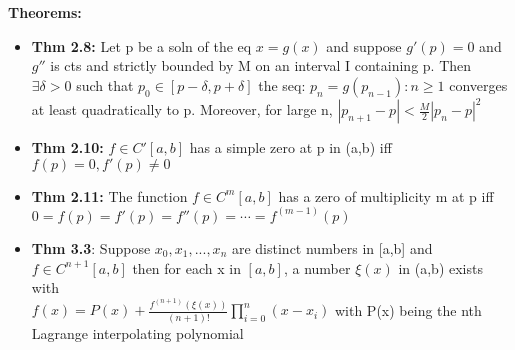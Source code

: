\documentclass{article}
\begin{document}
\begin{minipage}[t]{0.49\textwidth}
\textbf{Theorems:}
\begin{itemize}
  \item {\textbf{Thm 2.8:} Let p be a soln of the eq $x=g(x)$ and suppose $g'(p)=0$ and $g''$ is cts and strictly bounded by M on an interval I containing p. Then $\exists \delta > 0$ such that $p_0\in[p-\delta, p+\delta]$ the seq: $p_n=g(p_{n-1}): n\ge1$ converges at least quadratically to p. Moreover, for large n, $|p_{n+1}-p|<\frac{M}{2}|p_n-p|^2$ }
  \item {\textbf{Thm 2.10:} $f\in C'[a,b]$ has a simple zero at p in (a,b) iff $f(p)=0,f'(p)\ne0$ }
  \item {\textbf{Thm 2.11:} The function $f\in C^m[a,b]$ has a zero of multiplicity m at p iff $0=f(p)=f'(p)=f''(p)=\cdots=f^{(m-1)}(p)$ }
  \item {\textbf{Thm 3.3}: Suppose $x_0,x_1,...,x_n$ are distinct numbers in [a,b] and $f\in C^{n+1}[a,b]$ then for each x in $[a,b]$, a number $\xi(x)$ in (a,b) exists with}\\
  $f(x)=P(x)+\frac{f^{(n+1)}(\xi(x))}{(n+1)!}\prod_{i=0}^{n}(x-x_i)$
  with P(x) being the nth Lagrange interpolating polynomial
\end{itemize}


\end{minipage}
\end{document}

